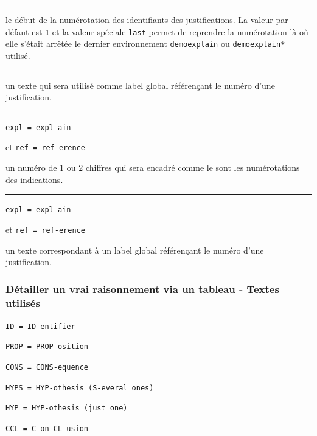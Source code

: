 \documentclass[12pt,a4paper]{book}
\newcommand\env[1]{\texttt{#1}}
\theoremstyle{definition}
\newcommand\separation{
	\medskip
	\hfill\rule{0.5\textwidth}{0.75pt}\hfill
	\medskip
}
\newcommand\extraspace{
	\vspace{0.25em}
}
\newcommand\mwhyprefix[2]{%
	\texttt{#1 = #1-#2}%
}
\newcommand\prefix[1]{%
	\texttt{#1}%
}
\begin{document}
{{\separation



 le début de la numérotation des identifiants des justifications.
              La valeur par défaut est \verb+1+ et la valeur spéciale \verb+last+ permet de reprendre la numérotation là où elle s'était arrêtée le dernier environnement \env{demoexplain} ou \env{demoexplain*} utilisé.


\separation



\IDoption{} un texte qui sera utilisé comme label global référençant le numéro d'une justification.


\separation


  \hfill \mwhyprefix{expl}{ain}
                             et \mwhyprefix{ref}{erence}

\IDarg{} un numéro de $1$ ou $2$ chiffres qui sera encadré comme le sont les numérotations des indications.


\separation


  \hfill \mwhyprefix{expl}{ain}
                              et \mwhyprefix{ref}{erence}

\IDarg{} un texte correspondant à un label global référençant le numéro d'une justification.


\subsubsection{Détailler un \og vrai \fg{} raisonnement via un tableau - Textes utilisés}

     \hfill \mwhyprefix{ID}{entifier}


   \hfill \mwhyprefix{PROP}{osition}

   \hfill \mwhyprefix{CONS}{equence}

\extraspace

   \hfill \prefix{HYPS = HYP-othesis (S-everal ones)} 

    \hfill \prefix{HYP = HYP-othesis (just one)}

    \hfill \prefix{CCL = C-on-CL-usion}

\extraspace



}}
\end{document}
